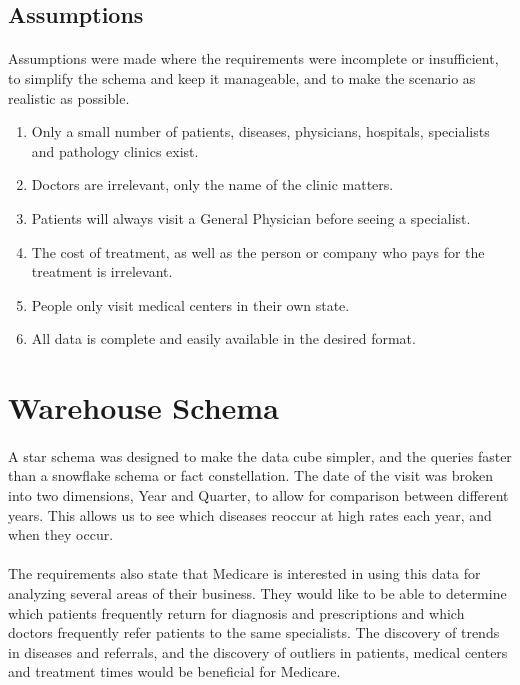 \documentclass[a4paper,12pt,openbib]{article}
\begin{document}
\subsection*{Assumptions}
\paragraph{}
Assumptions were made where the requirements were incomplete or insufficient, to simplify the schema and keep it manageable, and to make the scenario as realistic as possible.
\begin{enumerate}
	\item Only a small number of patients, diseases, physicians, hospitals, specialists and pathology clinics exist.
	\item Doctors are irrelevant, only the name of the clinic matters.
	\item Patients will always visit a General Physician before seeing a specialist.
	\item The cost of treatment, as well as the person or company who pays for the treatment is irrelevant.
	\item People only visit medical centers in their own state.
	\item All data is complete and easily available in the desired format.
\end{enumerate}

\section*{Warehouse Schema}
\paragraph{}
A star schema was designed to make the data cube simpler, and the queries faster than a snowflake schema or fact constellation.
The date of the visit was broken into two dimensions, Year and Quarter, to allow for comparison between different years.
This allows us to see which diseases reoccur at high rates each year, and when they occur.
\paragraph{}
The requirements also state that Medicare is interested in using this data for analyzing several areas of their business.
They would like to be able to determine which patients frequently return for diagnosis and prescriptions and which doctors frequently refer patients to the same specialists.
The discovery of trends in diseases and referrals, and the discovery of outliers in patients, medical centers and treatment times would be beneficial for Medicare.
\end{document}
